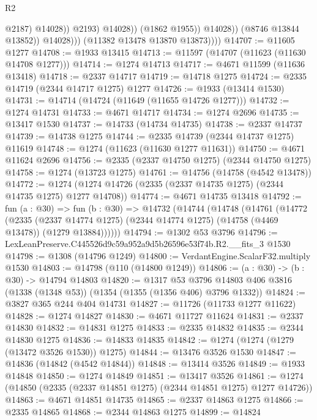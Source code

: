\begin{lexlean}{R2}
\begin{coremodule}
                                    @2187)
                                  @14028))
                              @2193)
                            @14028))
                        (@1862 @1955))
                      @14028))
                  (@8746 @13844 @13852))
                @14028)))
          (@11382 @13478 @13870 @13873))))
@14707 := @11605 @1277
@14708 := @1933 @13415
@14713 := @11597 (@14707 (@11623 (@11630 @14708 @1277)))
@14714 := @1274 @14713
@14717 := @4671 @11599 (@11636 @13418)
@14718 := @2337 @14717
@14719 := @14718 @1275
@14724 := @2335 @14719 (@2344 @14717 @1275) @1277
@14726 := @1933 (@13414 @1530)
@14731 := @14714 (@14724 (@11649 (@11655 @14726 @1277)))
@14732 := @1274 @14731
@14733 := @4671 @14717
@14734 := @1274 @2696
@14735 := @13417 @1530
@14737 := @14733 (@14734 @14735)
@14738 := @2337 @14737
@14739 := @14738 @1275
@14744 := @2335 @14739 (@2344 @14737 @1275) @11619
@14748 := @1274 (@11623 (@11630 @1277 @11631))
@14750 := @4671 @11624 @2696
@14756 := @2335 (@2337 @14750 @1275) (@2344 @14750 @1275)
@14758 := @1274 (@13723 @1275)
@14761 := @14756 (@14758 (@4542 @13478))
@14772 := @1274 (@1274 @14726 (@2335 (@2337 @14735 @1275) (@2344 @14735 @1275) @1277 @14708))
@14774 := @4671 @14735 @13418
@14792 := fun (a : @30) =>
  fun (b : @30) =>
  @14732
    (@14744
      (@14748
        (@14761
          (@14772
            (@2335
              (@2337 @14774 @1275)
              (@2344 @14774 @1275)
              (@14758 (@4469 @13478))
              (@1279 @13884))))))
@14794 := @1302 @53 @3796
@14796 := LexLeanPreserve.C445526d9c59a952a9d5b26596e53f74b.R2.__fits_3 @1530
@14798 := @1308 (@14796 @1249)
@14800 := VerdantEngine.ScalarF32.multiply @1530
@14803 := @14798 (@110 (@14800 @1249))
@14806 := (a : @30) -> (b : @30) -> @14794 @14803
@14820 := @1317
    @53
    @3796
    @14803
    @406
    @3816
    (@1338 (@1348 @53))
    (@1354 (@1355 (@1356 @406) @3796 @1332))
@14824 := @3827 @365 @244 @404 @14731
@14827 := @11726 (@11733 @1277 @11622)
@14828 := @1274 @14827
@14830 := @4671 @11727 @11624
@14831 := @2337 @14830
@14832 := @14831 @1275
@14833 := @2335 @14832
@14835 := @2344 @14830 @1275
@14836 := @14833 @14835
@14842 := @1274 (@1274 (@1279 (@13472 @3526 @1530)) @1275)
@14844 := @13476 @3526 @1530
@14847 := @14836 (@14842 (@4542 @14844))
@14848 := @13414 @3526
@14849 := @1933 @14848
@14850 := @1274 @14849
@14851 := @13417 @3526
@14861 := @1274 (@14850 (@2335 (@2337 @14851 @1275) (@2344 @14851 @1275) @1277 @14726))
@14863 := @4671 @14851 @14735
@14865 := @2337 @14863 @1275
@14866 := @2335 @14865
@14868 := @2344 @14863 @1275
@14899 := @14824

\end{coremodule}
\end{lexlean}
